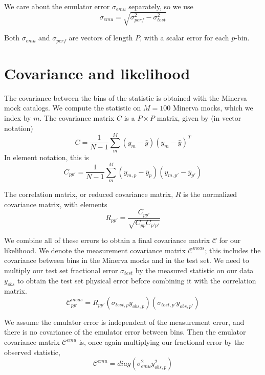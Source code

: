 \documentclass[12pt]{article}
\begin{document}
We care about the emulator error $\sigma_{emu}$ separately, so we use
\begin{equation}
    \sigma_{emu} = \sqrt{ \sigma_{perf}^2 - \sigma_{test}^2 }
\end{equation}

Both $\sigma_{emu}$ and $\sigma_{perf}$ are vectors of length $P$, with a scalar error for each $p$-bin. 

\section{Covariance and likelihood}

The covariance between the bins of the statistic is obtained with the Minerva mock catalogs. 
We compute the statistic on $M=100$ Minerva mocks, which we index by $m$. 
The covariance matrix $C$ is a $P \times P$ matrix, given by (in vector notation)
\begin{equation}
C = \frac{1}{N-1} \sum_m^M (y_{m} - \bar{y})(y_{m} - \bar{y})^T
\end{equation}
In element notation, this is
\begin{equation}
C_{pp'} = \frac{1}{N-1} \sum_m^M (y_{m,p} - \bar{y}_{p})(y_{m,p'} - \bar{y}_{p'}) 
\end{equation}

The correlation matrix, or reduced covariance matrix, $R$ is the normalized covariance matrix, with elements
\begin{equation}
R_{pp'} = \frac{C_{pp'}}{\sqrt{ C_{pp} C_{p'p'}}} 
\end{equation}

We combine all of these errors to obtain a final covariance matrix $\mathcal{C}$ for our likelihood.
We denote the measurement covariance matrix $\mathcal{C}^{meas}$; this includes the covariance between bins in the Minerva mocks and in the test set.
We need to multiply our test set fractional error $\sigma_{test}$ by the measured statistic on our data $y_{obs}$ to obtain the test set physical error before combining it with the correlation matrix.
\begin{equation}
    \mathcal{C}_{pp'}^{meas} = R_{pp'} (\sigma_{test,p}y_{obs, p}) (\sigma_{test,p'}y_{obs, p'})
\end{equation}

We assume the emulator error is independent of the measurement error, and there is no covariance of the emulator error between bins.
Then the emulator covariance matrix $\mathcal{C}^{emu}$ is, once again multiplying our fractional error by the observed statistic,
\begin{equation}
    \mathcal{C}^{emu} = diag(\sigma_{emu}^2 y_{obs, p}^2)
\end{equation}
\end{document}
